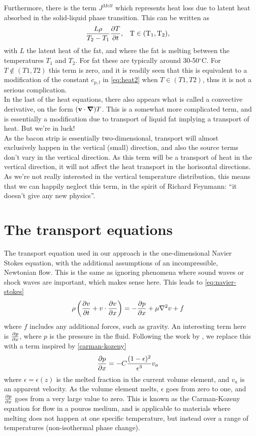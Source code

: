 Furthermore, there is the term $J^{Melt}$ which represents heat loss due to
latent heat absorbed in the solid-liquid phase transition. This can be written as 
\[ \frac{L \rho}{T_2-T_1} \frac{\partial T}{\partial t} \rm{,} \quad T \in (T_1,T_2) \rm{,}\]
with $L$ the latent heat of the fat, and where the fat is melting between the temperatures 
$T_1$ and $T_2$. For fat these are typically around 30-50$^\circ$C. For $T \notin (T1,T2)$ 
this term is zero, and it is readily seen that this is equivalent to a modification of the constant
$c_{p,l}$ in \cref{eq:heat2} when $T \in (T1,T2)$, thus it is not a serious
complication.\\

In the last of the heat equations, there also appears what is called a
convective derivative, on the form $(\mathbf{v}\cdot \mbox{\boldmath$ \nabla $})T$. This is a somewhat
more complicated term, and is essentially a modification due to transport of
liquid fat implying a transport of heat. But we're in luck! \\

As the bacon strip is essentially two-dimensional, transport will almost
exclusively happen in the vertical (small) direction, and also the
source terms don't vary in the vertical direction. As this term will be a transport
of heat in the vertical direction, it will not affect the heat transport in
the horisontal directions.  As we're not really
interested in the vertical temperature distribution, this means that we can
happily neglect this term, in the spirit of Richard Feynmann: ``it doesn't give
any new physics''.

\section{The transport equations}
The transport equation used in our approach is the one-dimensional Navier Stokes
equation, with the additional assumptions of an incompressible, Newtonian flow.
This is the same as ignoring phenomena where sound waves or shock waves are
important, which makes sense here. This leads to \cref{eq:navier-stokes}
\begin{equation}
  \rho \left(\frac{\partial v}{\partial t} + v \cdot \frac{\partial v}{\partial x}\right) = -\frac{\partial p}{\partial x} + \mu \nabla^2 v + f
 \label{eq:navier-stokes}
\end{equation}
where $f$ includes any additional forces, such as gravity. An interesting term here is $\frac{\partial p}{\partial x}$, where
$p$ is the pressure in the fluid. Following the work by \cite{brent}, we replace
this with a term inspired by \cref{carman-kozeny}
\begin{equation}
  \frac{\partial p}{\partial x} = -C\frac{ (1-\epsilon)^2}{\epsilon^3} v_a
  \label{carman-kozeny}
\end{equation}
where $\epsilon = \epsilon(z)$ is the melted fraction in the current volume element, and
$v_a$ is an apparent velocity. As the volume element melts, $\epsilon$ goes from
zero to one, and $\frac{\partial p}{\partial x}$ goes from a very large value to zero. This is known 
as the Carman-Kozeny equation for flow in a pouros medium, and is applicable to 
materials where melting does not happen at one specific temperature, but instead 
over a range of temperatures (non-isothermal phase change). \cite{poirier} \\

